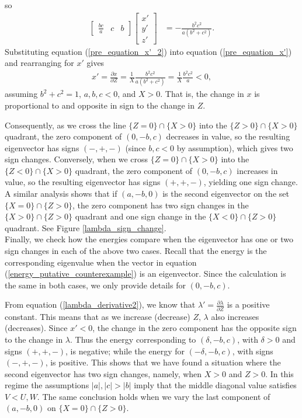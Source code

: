 \documentclass[preprint,12pt]{elsarticle}
\begin{document}
so
\begin{align}\label{pre_equation_x'_2}
\begin{bmatrix}
    \frac{bc}{a} & c & b
\end{bmatrix}   \begin{bmatrix}
                    x'\\
                    y'\\
                    z'
                \end{bmatrix}&=-\frac{b^2c^2}{a(b^2+c^2)}.
\end{align}
Substituting equation (\ref{pre_equation_x'_2}) into equation (\ref{pre_equation_x'}) and rearranging for $x'$ gives
\begin{align}
    x'=\frac{\partial x}{\partial Z}=\frac{1}{X}\frac{b^2c^2}{a(b^2+c^2)}=\frac{1}{X}\frac{b^2c^2}{a}<0,
\end{align}
assuming $b^2+c^2=1$, $a,b,c<0$, and $X>0$. That is, the change in $x$ is proportional to and opposite in sign to the change in $Z$.

Consequently, as we cross the line $\{Z=0\}\cap\{X>0\}$ into the $\{Z>0\}\cap\{X>0\}$ quadrant, the zero component of $(0,-b,c)$ decreases in value, so the resulting eigenvector has signs $(-,+,-)$ (since $b,c<0$ by assumption), which gives two sign changes. Conversely, when we cross $\{Z=0\}\cap\{X>0\}$ into the $\{Z<0\}\cap\{X>0\}$ quadrant, the zero component of $(0,-b,c)$ increases in value, so the resulting eigenvector has signs $(+,+,-)$, yielding one sign change. A similar analysis shows that if $(a,-b,0)$ is the second eigenvector on the set $\{X=0\}\cap\{Z>0\}$, the zero component has two sign changes in the $\{X>0\}\cap\{Z>0\}$ quadrant and one sign change in the $\{X<0\}\cap\{Z>0\}$ quadrant. See Figure \ref{lambda_sign_change}.\\ 

Finally, we check how the energies compare when the eigenvector has one or two sign changes in each of the above two cases. Recall that the energy is the corresponding eigenvalue when the vector in equation (\ref{energy_putative_counterexample}) is an eigenvector. Since the calculation is the same in both cases, we only provide details for $(0,-b,c)$. 

From equation (\ref{lambda_derivative2}), we know that $\lambda'=\frac{\partial\lambda}{\partial Z}$ is a positive constant. This means that as we increase (decrease) $Z$, $\lambda$ also increases (decreases). Since $x'<0$, the change in the zero component has the opposite sign to the change in $\lambda$. Thus the energy corresponding to $(\delta,-b,c)$, with $\delta>0$ and signs $(+,+,-)$, is negative; while the energy for $(-\delta,-b,c)$, with signs $(-,+,-)$, is positive. This shows that we have found a situation where the second eigenvector has two sign changes, namely, when $X>0$ and $Z>0$. In this regime the assumptions $|a|,|c|>|b|$ imply that the middle diagonal value satisfies $V<U,W$. The same conclusion holds when we vary the last component of $(a,-b,0)$ on $\{X=0\}\cap\{Z>0\}$.
\end{document}
